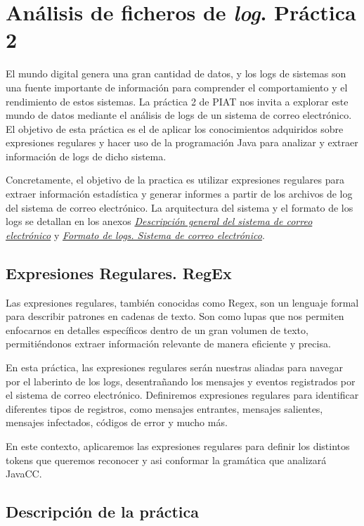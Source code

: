 \section{Análisis de ficheros de \textit{log}. Práctica 2}

\noindent El mundo digital genera una gran cantidad de datos, y los logs de sistemas son una fuente importante de información para comprender el comportamiento y el rendimiento de estos sistemas. La práctica 2 de PIAT nos invita a explorar este mundo de datos mediante el análisis de logs de un sistema de correo electrónico. El objetivo de esta práctica es el de aplicar los conocimientos adquiridos sobre expresiones regulares y hacer uso de la programación Java para analizar y extraer información de logs de dicho sistema.

Concretamente, el objetivo de la practica es utilizar expresiones regulares para extraer información estadística y generar informes a partir de los archivos de log del sistema de correo electrónico. La arquitectura del sistema y el formato de los logs se detallan en los anexos \hyperref[sec:P2SistemaCorreo]{\textit{Descripción general del sistema de correo electrónico}} y \hyperref[sec:logscorreo]{\textit{Formato de logs. Sistema de correo electrónico}}.


\subsection{Expresiones Regulares. RegEx}

\noindent Las expresiones regulares, también conocidas como Regex, son un lenguaje formal para describir patrones en cadenas de texto. Son como lupas que nos permiten enfocarnos en detalles específicos dentro de un gran volumen de texto, permitiéndonos extraer información relevante de manera eficiente y precisa.

En esta práctica, las expresiones regulares serán nuestras aliadas para navegar por el laberinto de los logs, desentrañando los mensajes y eventos registrados por el sistema de correo electrónico. Definiremos expresiones regulares para identificar diferentes tipos de registros, como mensajes entrantes, mensajes salientes, mensajes infectados, códigos de error y mucho más.

En este contexto, aplicaremos las expresiones regulares para definir los distintos tokens que queremos reconocer y asi conformar la gramática que analizará JavaCC.

\subsection{Descripción de la práctica}

